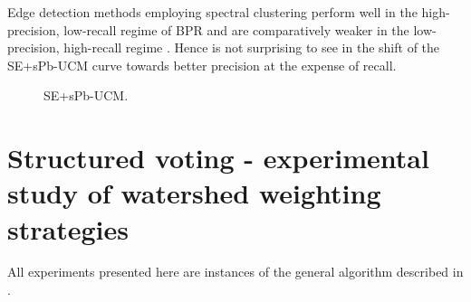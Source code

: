 Edge detection methods employing spectral clustering %
perform well in the high-precision, low-recall regime of BPR and are comparatively weaker in the low-precision, high-recall regime \cite{Fowlkes04,Yu2005segmentation}. Hence is not surprising to see in  the shift of the SE+sPb-UCM curve towards better precision at the expense of recall.

\begin{figure}[ht!]
\centering
\caption[(SE and spectralPb)-UCM plots]{SE+sPb-UCM.}
\label{fig:SE_nnms_sPb-UCM}
\end{figure}



\section[Structured voting]{Structured voting - experimental study of watershed weighting strategies} %
\label{sec:ch5-structured-voting}
All experiments presented here are instances of the general algorithm described in .

